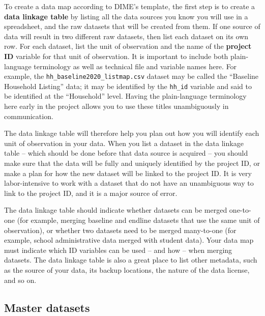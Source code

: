 To create a data map according to DIME's template,
the first step is to create a \textbf{data linkage table} by listing
all the data sources you know you will use in a spreadsheet,
and the raw datasets that will be created from them.
If one source of data will result in two different raw datasets,
then list each dataset on its own row.
For each dataset, list the unit of observation
and the name of the \textbf{project ID}
variable for that unit of observation.
It is important to include both plain-language terminology
as well as technical file and variable names here.
For example, the \texttt{hh\_baseline2020\_listmap.csv} dataset
may be called the ``Baseline Household Listing'' data;
it may be identified by the \texttt{hh\_id} variable
and said to be identified at the ``Household'' level.
Having the plain-language terminology here early in the project
allows you to use these titles unambiguously in communication.

The data linkage table will therefore help you plan out
how you will identify each unit of observation in your data.
When you list a dataset in the data linkage table --
which should be done before that data source is acquired --
you should make sure that the data will
be fully and uniquely identified by the project ID,
or make a plan for how the new dataset will be linked to the project ID.
It is very labor-intensive to work with a dataset that
do not have an unambiguous way to link to the project ID,
and it is a major source of error.

The data linkage table should indicate whether
datasets can be merged one-to-one (for example,
merging baseline and endline datasets
that use the same unit of observation),
or whether two datasets need to be merged many-to-one
(for example, school administrative data merged with student data).
Your data map must indicate which ID variables
can be used -- and how -- when merging datasets.
The data linkage table is also a great place to list other metadata,
such as the source of your data, its backup locations,
the nature of the data license, and so on.

\subsection{Master datasets}

